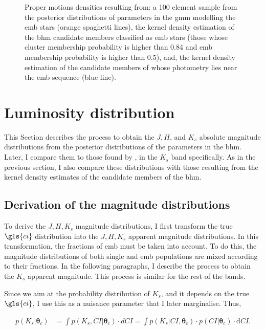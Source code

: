 \begin{figure}[ht!]
\begin{subfigure}[t]{0.45\textwidth}
        \caption{}
    \end{subfigure}
\caption{Proper motions densities resulting from: a 100 element sample from the posterior distributions of parameters in the \gls{gmm} modelling the \gls{emb} stars (orange spaghetti lines), the kernel density estimation of the \gls{bhm} candidate members classified as \gls{emb} stars (those whose cluster membership probability is higher than 0.84 and \gls{emb} membership probability is higher than 0.5), and, the kernel density estimation of the candidate members of \citet{Bouy2015} whose photometry lies near the \gls{emb} sequence (blue line).}
\label{fig:PMBs}
\end{figure}

\section{Luminosity distribution}
\label{sect:luminosity}
This Section describes the process to obtain the $J,H$, and $K_s$ absolute magnitude distributions from the posterior distributions of the parameters in the \gls{bhm}. Later, I compare them to those found by \citet{Bouy2015}, in the $K_s$ band specifically. As in the previous section, I also compare these distributions with those resulting from the kernel density estimates of the candidate members of the \gls{bhm}.

\subsection{Derivation of the magnitude distributions}
\label{subsect:deriveluminosity}
To derive the $J,H,K_s$ magnitude distributions, I first transform the true $\gls{ci}$ distribution into the $J,H,K_s$ apparent magnitude distributions. In this transformation, the fractions of \gls{emb} must be taken into account. To do this, the magnitude distributions of both single and \gls{emb} populations are mixed according to their fractions. In the following paragraphs, I describe the process to obtain the $K_s$ apparent magnitude. This process is similar for the rest of the bands. 

Since we aim at the probability distribution of $K_s$, and it depends on the true $\gls{ci}$, I use this as a nuisance parameter that I later marginalise. Thus, 

\begin{align}
p(K_s | \boldsymbol{\theta}_c) & = \int p(K_s,CI | \boldsymbol{\theta}_c) \cdot dCI =  \int p(K_s | CI ,\boldsymbol{\theta}_c) \cdot p(CI|\boldsymbol{\theta}_c)\cdot \mathrm{d}CI. \nonumber
\end{align}


